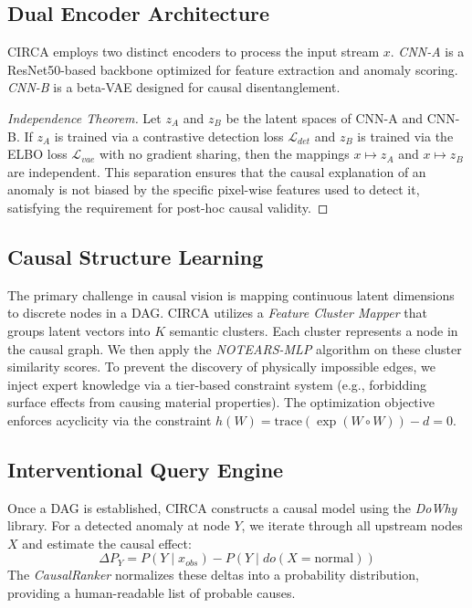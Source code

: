 \documentclass{article}
\begin{document}
\subsection{Dual Encoder Architecture}
CIRCA employs two distinct encoders to process the input stream $x$. \emph{CNN-A} is a ResNet50-based backbone optimized for feature extraction and anomaly scoring. \emph{CNN-B} is a beta-VAE designed for causal disentanglement.
\begin{proof}[Independence Theorem]
Let $z_A$ and $z_B$ be the latent spaces of CNN-A and CNN-B. If $z_A$ is trained via a contrastive detection loss $\mathcal{L}_{det}$ and $z_B$ is trained via the ELBO loss $\mathcal{L}_{vae}$ with no gradient sharing, then the mappings $x \mapsto z_A$ and $x \mapsto z_B$ are independent. This separation ensures that the causal explanation of an anomaly is not biased by the specific pixel-wise features used to detect it, satisfying the requirement for post-hoc causal validity.
\end{proof}

\subsection{Causal Structure Learning}
The primary challenge in causal vision is mapping continuous latent dimensions to discrete nodes in a DAG. CIRCA utilizes a \emph{Feature Cluster Mapper} that groups latent vectors into $K$ semantic clusters. Each cluster represents a node in the causal graph. We then apply the \emph{NOTEARS-MLP} algorithm on these cluster similarity scores. To prevent the discovery of physically impossible edges, we inject expert knowledge via a tier-based constraint system (e.g., forbidding surface effects from causing material properties). The optimization objective enforces acyclicity via the constraint $h(W) = \text{trace}(\exp(W \circ W)) - d = 0$.

\subsection{Interventional Query Engine}
Once a DAG is established, CIRCA constructs a causal model using the \emph{DoWhy} library. For a detected anomaly at node $Y$, we iterate through all upstream nodes $X$ and estimate the causal effect:
\begin{equation}
    \Delta P_Y = P(Y \mid x_{obs}) - P(Y \mid do(X = \text{normal}))
\end{equation}
The \emph{CausalRanker} normalizes these deltas into a probability distribution, providing a human-readable list of probable causes.
\end{document}
